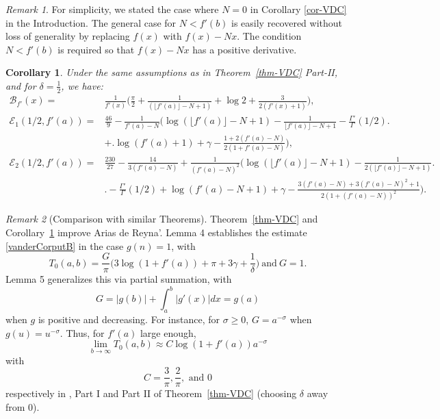 \documentclass[11pt,letterpaper,oneside,reqno]{amsart}
\renewcommand{\^}[1]{\widehat{#1}}
\newcommand{\s}{\sigma}
\numberwithin{equation}{section}
\newtheorem{corollary}{Corollary}[theorem]
\theoremstyle{remark}
\newtheorem*{remark}{Remark}
\newcommand*{\thmref}[1]{Theorem~\ref{#1}}
\newcommand*{\corref}[1]{Corollary~\ref{#1}}
\begin{document}
%
\begin{remark}
For simplicity, we stated the case where $N=0$ in Corollary \ref{cor-VDC} in the Introduction. The general case for $N< f'(b)$ is easily recovered without loss of generality by replacing $f(x)$ with $f(x)-Nx$. The condition $N< f'(b)$ is required so that $f(x)-Nx$ has a positive derivative. %
\end{remark}
%
\begin{corollary}\label{cor-thmVDC-partII}
Under the same assumptions as in \thmref{thm-VDC} Part-II, and for $\delta=\frac{1}{2}$, we have:
\begin{align} 
\label{def:B_f(Z+1/2)}
\mathcal{B}_{f'}(x) =&  \frac{1}{f'(x)}\Big( \frac{\pi}{2}  + \frac{1}{(\lfloor f'(a) \rfloor-N+1)} + \log 2+\frac{3}{2(f'(x)+1)}\Big),
\\
\label{def:E1(Z+1/2)}
\mathcal{E}_1 \left(1/2, f'(a)\right)=&
\frac{46}{9} - \frac{1}{f'(a)-N}\Big(\log(\lfloor f'(a) \rfloor -N+ 1) - \frac{1}{\lfloor f'(a) \rfloor-N + 1} - \frac{\Gamma'}{\Gamma} (1/2) \Big.
\\& + \Big.\log(f'(a) + 1) + \gamma - \frac{1+2(f'(a)-N)}{2(1+f'(a)-N)}\Big),
\\
\label{def:E2(Z+1/2)}
\mathcal{E}_2\left(1/2, f'(a)\right)=&
\frac{230}{27} - \frac{14}{3(f'(a)-N)} +\frac{1}{(f'(a)-N)^2}\Big( \log(\lfloor f'(a) \rfloor-N + 1) - \frac{1}{2(\lfloor f'(a) \rfloor-N + 1)} 
\Big.\\ &\Big.
- \frac{\Gamma'}{\Gamma}(1/2) +\log(f'(a)-N + 1) + \gamma - \frac{3(f'(a)-N) + 3(f'(a)-N)^2 + 1}{2(1+(f'(a)-N))^2}\Big).
\end{align}  
\end{corollary}
%
\begin{remark}[Comparison with similar Theorems]
\thmref{thm-VDC} and \corref{cor-thmVDC-partII} improve Arias de Reyna'\cite[Lemmas 4 and 5]{dereyna2024approximationzetafunctiondirichlet}.
Lemma 4 establishes the estimate \eqref{vanderCorputB} in the case $g(n)=1$, with 
\[
T_0(a,b) =  \frac{ G}{\pi}\Big(3\log(1+f'(a))+\pi+3\gamma+\frac{1}{\delta}\Big) \ \text{and}\ G= 1.
%
\]
Lemma 5 generalizes this via partial summation, with
\[
G= |g(b)|+\int_a^b |g'(x)| dx=g(a)
\]
when $g$ is positive and decreasing. For instance, for $\s\geq 0$, $G=a^{-\sigma}$ when $g(u) = u^{-\s}$. 
Thus, for $f'(a)$ large enough, 
\[ \lim_{b\to\infty} T_0(a,b) \approx  C \log(1+f'(a) ) a^{-\sigma}
\] 
with \[
C=\frac3{\pi}, \frac2{\pi}, \text{ and }0
\] respectively in \cite[Lemma 5]{dereyna2024approximationzetafunctiondirichlet}, Part I and Part II of  \thmref{thm-VDC} (choosing $\delta $ away from $0$). 
\end{remark}
%
\end{document}
